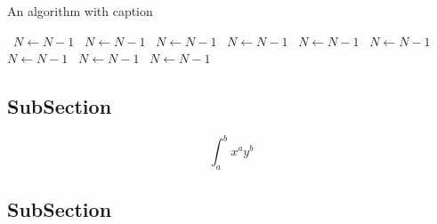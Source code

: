 \documentclass[a4paper]{article}
\begin{document}
\begin{algorithm}
\caption{An algorithm with caption}
\begin{algorithmic}
\    \State $N \gets N - 1$
\    \State $N \gets N - 1$
\    \State $N \gets N - 1$
\    \State $N \gets N - 1$
\    \State $N \gets N - 1$
\    \State $N \gets N - 1$
\    \State $N \gets N - 1$
\    \State $N \gets N - 1$
\    \State $N \gets N - 1$
\EndWhile
\end{algorithmic}
\end{algorithm}

\subsection{SubSection}

\[ \int_{a}^{b}{x^{a}y^{b}} \]

\subsection{SubSection}
\end{document}
